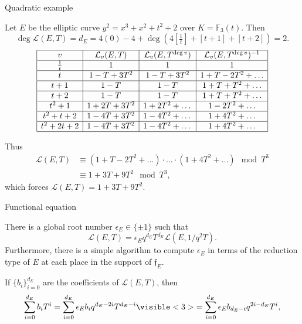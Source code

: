 \documentclass[10pt]{beamer}
\begin{document}
\begin{frame}[t]{Quadratic example}

Let $ E $ be the elliptic curve $ y^2 = x^3 + x^2 + t^2 + 2 $ over $ K = \mathbb{F}_3(t) $. \pause Then
$$ \deg\mathcal{L}(E, T) = d_E = 4(0) - 4 + \deg(4[\tfrac{1}{t}] + [t + 1] + [t + 2]) = 2. $$
\pause \vspace{-0.5cm}
$$
\begin{array}{|c|c|c|c|}
\hline
v & \mathcal{L}_v(E, T) & \mathcal{L}_v(E, T^{\deg v}) & \mathcal{L}_v(E, T^{\deg v})^{-1} \\
\hline
\tfrac{1}{t} & 1 & 1 & 1 \\
\hline
t & 1 - T + 3T^2 & 1 - T + 3T^2 & 1 + T - 2T^2 + \dots \\
\hline
t + 1 & 1 - T & 1 - T & 1 + T + T^2 + \dots \\
\hline
t + 2 & 1 - T & 1 - T & 1 + T + T^2 + \dots \\
\hline
t^2 + 1 & 1 + 2T + 3T^2 & 1 + 2T^2 + \dots & 1 - 2T^2 + \dots \\
\hline
t^2 + t + 2 & 1 - 4T + 3T^2 & 1 - 4T^2 + \dots & 1 + 4T^2 + \dots \\
\hline
t^2 + 2t + 2 & 1 - 4T + 3T^2 & 1 - 4T^2 + \dots & 1 + 4T^2 + \dots \\
\hline
\end{array}
$$

\pause

Thus
\begin{align*}
\mathcal{L}(E, T)
& \equiv (1 + T - 2T^2 + \dots) \cdot \dots \cdot (1 + 4T^2 + \dots) \mod T^3 \\
& \equiv 1 + 3T + 9T^2 \mod T^3,
\end{align*}
which forces $ \mathcal{L}(E, T) = 1 + 3T + 9T^2 $.

\end{frame}

\begin{frame}[t]{Functional equation}

\begin{corollary}
There is a global root number $ \epsilon_E \in \{\pm1\} $ such that
$$ \mathcal{L}(E, T) = \epsilon_Eq^{d_E}T^{d_E}\mathcal{L}(E, 1 / q^2T). $$
Furthermore, there is a simple algorithm to compute $ \epsilon_E $ in terms of the reduction type of $ E $ at each place in the support of $ \mathfrak{f}_E $.
\end{corollary}

\pause

\vspace{0.5cm} If $ \{b_i\}_{i = 0}^{d_E} $ are the coefficients of $ \mathcal{L}(E, T) $, then
$$ \sum_{i = 0}^{d_E} b_iT^i = \sum_{i = 0}^{d_E} \epsilon_Eb_iq^{d_E - 2i}T^{d_E - i} \visible<3>{= \sum_{i = 0}^{d_E} \epsilon_Eb_{d_E - i}q^{2i - d_E}T^i,} $$%

\end{frame}
\end{document}
